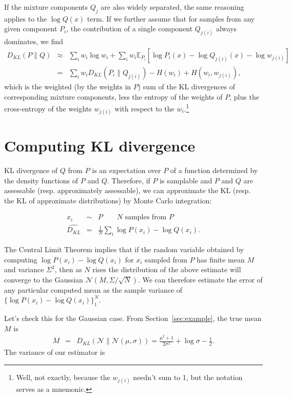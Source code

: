 \documentclass[12pt]{article}
\newcommand{\E}{\mathbb{E}}
\newcommand{\N}{\mathcal{N}}
\begin{document}
If the mixture components $Q_j$ are also widely separated, the same
reasoning applies to the $\log Q(x)$ term.  If we further assume that
for samples from any given component $P_i$, the contribution of a
single component $Q_{j(i)}$ always dominates, we find
\begin{eqnarray*}
 D_{KL}(P\|Q) & \approx & \sum_i w_i \log w_i + \sum_i w_i \E_{P_i} \left[ \log P_i(x) - \log Q_{j(i)}(x) - \log w_{j(i)} \right] \\
 & = & \sum_i w_i D_{KL}(P_i\|Q_{j(i)}) - H(w_i) + H(w_i, w_{j(i)}),
\end{eqnarray*}
which is the weighted (by the weights in $P$) sum of the KL divergences
of corresponding mixture components, less the entropy of the weights
of $P$, plus the cross-entropy of the weights $w_{j(i)}$ with respect
to the $w_i$.\footnote{Well, not exactly, because the $w_{j(i)}$ needn't
sum to 1, but the notation serves as a mnemonic.}

\section{Computing KL divergence}

KL divergence of $Q$ from $P$ is an expectation over $P$ of a function
determined by the density functions of $P$ and $Q$.  Therefore, if $P$
is samplable and $P$ and $Q$ are assessable (resp. approximately
assessable), we can approximate the KL (resp. the KL of approximate
distributions) by Monte Carlo integration:

\begin{eqnarray*}
 x_i & \sim & P \qquad \textrm{$N$ samples from $P$} \\
 \widehat{D_{KL}} & = & \frac{1}{N} \sum_i \log P(x_i) - \log Q(x_i).
\end{eqnarray*}

The Central Limit Theorem implies that if the random variable obtained
by computing $\log P(x_i) - \log Q(x_i)$ for $x_i$ sampled from $P$
has finite mean $M$ and variance $\Sigma^2$, then as $N$ rises the
distribution of the above estimate will converge to the Gaussian
$\N(M, \Sigma / \sqrt N)$.  We can therefore estimate the error
of any particular computed mean as the sample variance of
$\{\log P(x_i) - \log Q(x_i)\}_1^N$.

Let's check this for the Gaussian case.  From
Section~\ref{sec:example}, the true mean $M$ is
\begin{eqnarray*}
 M & = & D_{KL}(\N\|\N(\mu,\sigma)) = \frac{\mu^2 + 1}{2\sigma^2} + \log \sigma - \frac{1}{2}.
\end{eqnarray*}
The variance of our estimator
is
\end{document}
